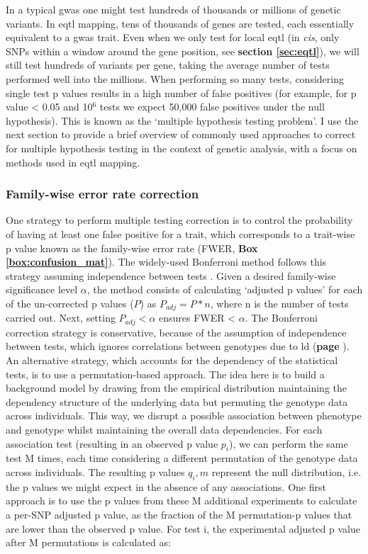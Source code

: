 In a typical \gls{gwas} one might test hundreds of thousands or millions of genetic variants. 
In e\gls{qtl} mapping, tens of thousands of genes are tested, each essentially equivalent to a \gls{gwas} trait. 
Even when we only test for local e\gls{qtl} (in \textit{cis}, only SNPs within a window around the gene position, see \textbf{section \ref{sec:eqtl}}), we will still test hundreds of variants per gene, taking the average number of tests performed well into the millions.
When performing so many tests, considering single test p values results in a high number of false positives (for example, for p value < 0.05 and 10$^6$ tests we expect 50,000 false positives under the null hypothesis). 
This is known as the `multiple hypothesis testing problem'. 
I use the next section to provide a brief overview of commonly used approaches to correct for multiple hypothesis testing in the context of genetic analysis, with a focus on methods used in e\gls{qtl} mapping.

\subsubsection{Family-wise error rate correction} 

One strategy to perform multiple testing correction is to control the probability of having at least one false positive for a trait, which corresponds to a trait-wise p value known as the family-wise error rate (FWER, \textbf{Box \ref{box:confusion_mat}}).
The widely-used Bonferroni method follows this strategy assuming independence between tests \cite{laird2010fundamentals}. 
Given a desired family-wise significance level $\alpha$, the method consists of calculating `adjusted p values' for each of the un-corrected p values ($P$) as $P_{adj} = P*n $, where n is the number of tests carried out.
Next, setting $P_{adj} < \alpha$ ensures FWER < $\alpha$. 
The Bonferroni correction strategy is conservative, because of the assumption of independence between tests, which ignores correlations between genotypes due to \gls{ld} (\textbf{page \pageref{sec:ld}}).\\

An alternative strategy, which accounts for the dependency of the statistical tests, is to use a permutation-based approach. 
The idea here is to build a background model by drawing from the empirical distribution maintaining the dependency structure of the underlying data but permuting the genotype data across individuals.
This way, we disrupt a possible association between phenotype and genotype whilst maintaining the overall data dependencies. 
For each association test (resulting in an observed p value $p_i$), we can perform the same test M times, each time considering a different permutation of the genotype data across individuals. 
The resulting p values $q_i,m$ represent the null distribution, i.e. the p values we might expect in the absence of any associations.
One first approach is to use the p values from these M additional experiments to calculate a per-SNP adjusted p value, as the fraction of the M permutation-p values that are lower than the observed p value. 
For test i, the experimental adjusted p value after M permutations is calculated as:

